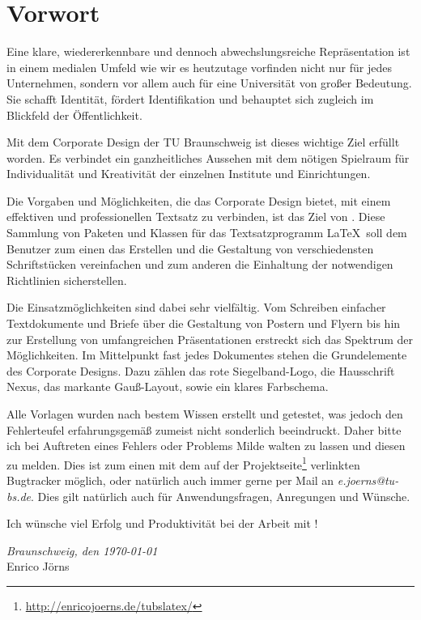 \chapter*{Vorwort}

Eine klare, wiedererkennbare und dennoch abwechslungsreiche
Repräsentation ist in einem medialen Umfeld wie wir es heutzutage
vorfinden nicht nur für jedes Unternehmen, sondern vor allem auch
für eine Universität von großer Bedeutung.
Sie schafft Identität, fördert Identifikation und behauptet sich zugleich im 
Blickfeld der Öffentlichkeit.

Mit dem Corporate Design der TU Braunschweig ist dieses wichtige Ziel
erfüllt worden. Es verbindet ein ganzheitliches Aussehen mit dem nötigen
Spielraum für Individualität und Kreativität der einzelnen Institute und 
Einrichtungen.\bigskip


Die Vorgaben und Möglichkeiten, die das Corporate Design bietet,
mit einem effektiven und professionellen Textsatz zu verbinden, ist
das Ziel von \tubslatex. Diese Sammlung von Paketen und Klassen
für das Textsatzprogramm \LaTeX\ soll dem Benutzer zum einen das Erstellen und
die Gestaltung von verschiedensten Schriftstücken vereinfachen und zum anderen
die Einhaltung der notwendigen Richtlinien sicherstellen.

Die Einsatzmöglichkeiten sind dabei sehr vielfältig.
Vom Schreiben einfacher Textdokumente und Briefe über die Gestaltung von Postern
und Flyern bis hin zur Erstellung von umfangreichen Präsentationen erstreckt
sich das Spektrum der Möglichkeiten.
Im Mittelpunkt fast jedes Dokumentes stehen die Grundelemente des Corporate
Designs. Dazu zählen das rote Siegelband-Logo, die Hausschrift Nexus,
das markante Gauß-Layout, sowie ein klares Farbschema.\bigskip


Alle Vorlagen wurden nach bestem Wissen erstellt und getestet, was
jedoch den Fehlerteufel erfahrungsgemäß zumeist nicht sonderlich beeindruckt.
Daher bitte ich bei Auftreten eines Fehlers oder Problems Milde walten
zu lassen und diesen zu melden.
Dies ist zum einen mit dem auf der Projektseite\footnote{\url{http://enricojoerns.de/tubslatex/}}
verlinkten Bugtracker möglich,
oder natürlich auch immer gerne per Mail an \textit{e.joerns@tu-bs.de}.
Dies gilt natürlich auch für Anwendungsfragen, Anregungen und Wünsche.

Ich wünsche viel Erfolg und Produktivität bei der Arbeit mit \tubslatex!

\hfill\textit{Braunschweig, den \today}\\[\bigskipamount]
\noindent Enrico Jörns

